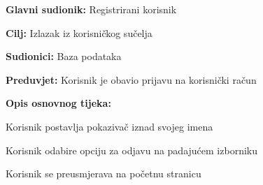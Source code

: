 \noindent {}
\begin{packed_item}

	\item \textbf{Glavni sudionik: }Registrirani korisnik
	\item  \textbf{Cilj:} Izlazak iz korisničkog sučelja
	\item  \textbf{Sudionici:} Baza podataka
	\item  \textbf{Preduvjet:} Korisnik je obavio prijavu na korisnički račun
	\item  \textbf{Opis osnovnog tijeka:}

	\item[] \begin{packed_enum}

		\item Korisnik postavlja pokazivač iznad svojeg imena
		\item Korisnik odabire opciju za odjavu na padajućem izborniku
		\item Korisnik se preusmjerava na početnu stranicu
	\end{packed_enum}
\end{packed_item}


